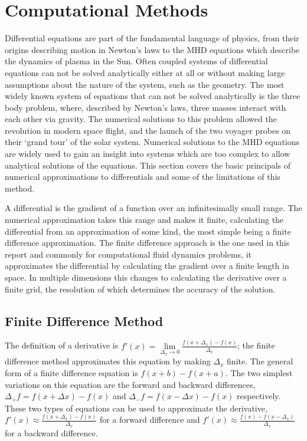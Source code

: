 \section{Computational Methods}\label{sec:numericalmethods}
Differential equations are part of the fundamental language of physics, from their origins describing motion in Newton's laws to the MHD equations which describe the dynamics of plasma in the Sun. 
Often coupled systems of differential equations can not be solved analytically either at all or without making large assumptions about the nature of the system, such as the geometry.
The most widely known system of equations that can not be solved analytically is the three body problem, where, described by Newton's laws, three masses interact with each other via gravity.
The numerical solutions to this problem allowed the revolution in modern space flight, and the launch of the two voyager probes on their `grand tour' of the solar system.
Numerical solutions to the MHD equations are widely used to gain an insight into systems which are too complex to allow analytical solutions of the equations.
This section covers the basic principals of numerical approximations to differentials and some of the limitations of this method.

A differential is the gradient of a function over an infinitesimally small range.
The numerical approximation takes this range and makes it finite, calculating the differential from an approximation of some kind, the most simple being a finite difference approximation.
The finite difference approach is the one used in this report and commonly for computational fluid dynamics problems, it approximates the differential by calculating the gradient over a finite length in space.
In multiple dimensions this changes to calculating the derivative over a finite grid, the resolution of which determines the accuracy of the solution.




\subsection{Finite Difference Method}

The definition of a derivative is $f'(x)=\lim\limits _{\Delta_{x}\to0}\frac{f(x+\Delta_{x})-f(x)}{\Delta_{x}}$; the finite difference method approximates this equation by making $\Delta_{x}$ finite.
The general form of a finite difference equation is $f(x+b)-f(x+a)$. The two simplest variations on this equation are the forward and backward differences, $\Delta_{+}f=f(x+\Delta x)-f(x)$ and $\Delta_{-}f=f(x-\Delta x)-f(x)$ respectively.
These two types of equations can be used to approximate the derivative, $f'(x)\approx\frac{f(x+\Delta_{x})-f(x)}{\Delta_{x}}$ for a forward difference and $f'(x)\approx\frac{f(x)-f(x-\Delta_{x})}{\Delta_{x}}$ for a backward difference.

